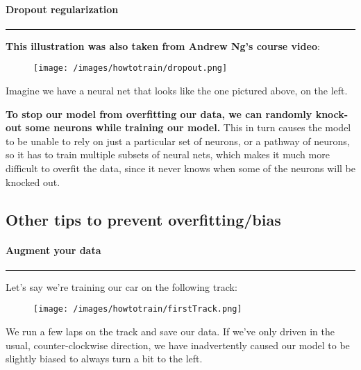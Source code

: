 \documentclass[
]{article}
\begin{document}
\hypertarget{header-n109}{%
\paragraph{\texorpdfstring{\textbf{Dropout
regularization}}{Dropout regularization}}\label{header-n109}}

\begin{center}\rule{0.5\linewidth}{0.5pt}\end{center}

\textbf{This illustration was also taken from Andrew Ng's course video}:

\begin{figure}
\centering
\texttt{[image: /images/howtotrain/dropout.png]}
\caption{}
\end{figure}

Imagine we have a neural net that looks like the one pictured above, on
the left.

\textbf{To stop our model from overfitting our data, we can randomly
knock-out some neurons while training our model.} This in turn causes
the model to be unable to rely on just a particular set of neurons, or a
pathway of neurons, so it has to train multiple subsets of neural nets,
which makes it much more difficult to overfit the data, since it never
knows when some of the neurons will be knocked out.

\hypertarget{header-n115}{%
\subsection{Other tips to prevent overfitting/bias}\label{header-n115}}

\hypertarget{header-n116}{%
\paragraph{\texorpdfstring{\textbf{Augment your
data}}{Augment your data}}\label{header-n116}}

\begin{center}\rule{0.5\linewidth}{0.5pt}\end{center}

Let's say we're training our car on the following track:

\begin{figure}
\centering
\texttt{[image: /images/howtotrain/firstTrack.png]}
\caption{}
\end{figure}

We run a few laps on the track and save our data. If we've only driven
in the usual, counter-clockwise direction, we have inadvertently caused
our model to be slightly biased to always turn a bit to the left.
\end{document}
